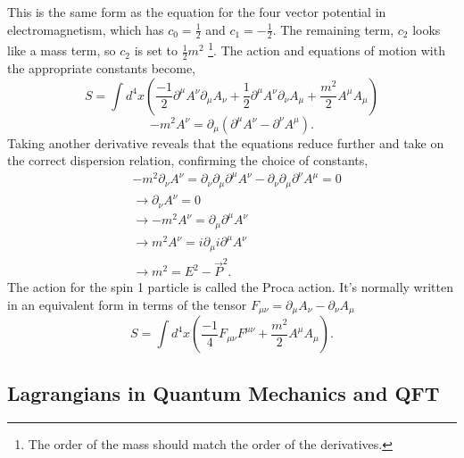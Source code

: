 This is the same form as the equation for the four vector potential in electromagnetism, which has $c_0 = \frac{1}{2}$ and $c_1 =-\frac{1}{2}$. The remaining term, $c_2$ looks like a mass term, so $c_2$ is set to $\frac{1}{2}m^2$ \footnote{The order of the mass should match the order of the derivatives.}. The action and equations of motion with the appropriate constants become, 
\begin{equation}
S = \int d^4x \left( \frac{-1}{2} \partial^\mu A^\nu\partial_\mu A_\nu + \frac{1}{2} \partial^\mu A^\nu\partial_\nu A_\mu + \frac{m^2}{2} A^\mu A_\mu \right)
\end{equation}
\begin{equation}
-m^2 A^\nu = \partial_\mu\left(\partial^\mu A^\nu - \partial^\nu A^\mu\right).
\end{equation}
Taking another derivative reveals that the equations reduce further and take on the correct dispersion relation, confirming the choice of constants,
\begin{equation}
\begin{split}
&-m^2 \partial_\nu A^\nu = \partial_\nu \partial_\mu \partial^\mu A^\nu - \partial_\nu \partial_\mu \partial^\nu A^\mu = 0 \\
&\rightarrow \partial_\nu A^\nu = 0 \\
&\rightarrow -m^2 A^\nu = \partial_\mu\partial^\mu A^\nu \\
&\rightarrow m^2 A^\nu = i\partial_\mu i\partial^\mu A^\nu \\
&\rightarrow m^2 = E^2 - \vec{P}^2.
\end{split}
\end{equation}
The action for the spin 1 particle is called the Proca action. It's normally written in an equivalent form in terms of the tensor $F_{\mu\nu} = \partial_\mu A_\nu - \partial_\nu A_\mu$
\begin{equation}
S = \int d^4x \left( \frac{-1}{4}F_{\mu\nu}F^{\mu\nu}  + \frac{m^2}{2} A^\mu A_\mu \right).
\end{equation}

\subsection{Lagrangians in Quantum Mechanics and QFT}

